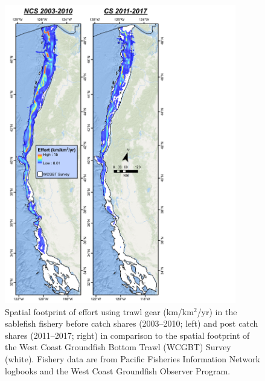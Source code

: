 \documentclass[11pt,
  english,
  a4paper,
]{article}
\begin{document}
\begin{figure}
\centering
\includegraphics[width=0.9\textwidth,height=0.9\textheight]{figs/Sablefish_Figures_TWL_lnDens_2views_avg_crop.pdf}
\caption{Spatial footprint of effort using trawl gear (km/km{\(^2\)\leavevmode\tagmcend\tagstructend}/yr) in the sablefish fishery before catch shares (2003--2010; left) and post catch shares (2011--2017; right) in comparison to the spatial footprint of the West Coast Groundfish Bottom Trawl (WCGBT) Survey (white). Fishery data are from Pacific Fisheries Information Network logbooks and the West Coast Groundfish Observer Program.\label{fig:footprinttwl}}
\end{figure}

\tagmcend\tagstructend

\end{document}

